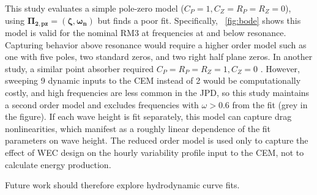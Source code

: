 \documentclass[10pt,twoside]{article}
\begin{document}
This study evaluates a simple pole-zero model ($C_P=1, C_Z=R_P=R_Z=0$), using $\mathbf{\Pi_{2,pz}=(\zeta,\omega_n)}$ but finds a poor fit.
Specifically, \figureautorefname~\ref{fig:bode} shows this model is valid for the nominal RM3 at frequencies at and below resonance.
Capturing behavior above resonance would require a higher order model such as one with five poles, two standard zeros, and two right half plane zeros.
In another study, a similar point absorber required $C_P=R_P=R_Z=1, C_Z=0$ \cite{bacelli_system_2017}.
However, sweeping 9 dynamic inputs to the CEM instead of 2 would be computationally costly, and high frequencies are less common in the JPD, so this study maintains a second order model and excludes frequencies with $\omega>0.6$ from the fit (grey in the figure).
If each wave height is fit separately, this model can capture drag nonlinearities, which manifest as a roughly linear dependence of the fit parameters on wave height.
The reduced order model is used only to capture the effect of WEC design on the hourly variability profile input to the CEM, not to calculate energy production.

Future work should therefore explore hydrodynamic curve fits.
\end{document}

